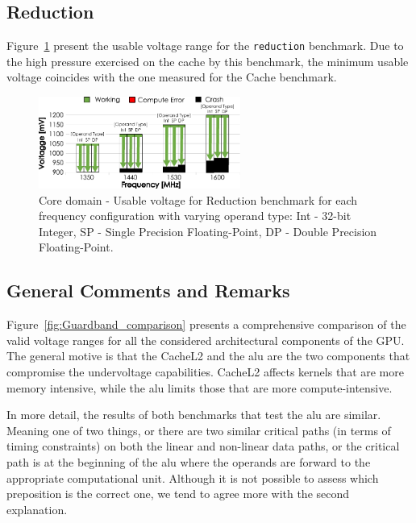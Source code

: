 \subsection{Reduction}

Figure~\ref{fig:Reduction_guardband} present the usable voltage range for the \texttt{reduction} benchmark. Due to the high pressure exercised on the cache by this benchmark, the minimum usable voltage coincides with the one measured for the Cache benchmark.

\begin{figure}[htb]
  \centering
  \includegraphics[width=0.59\textwidth]{Figures/GPU_characterization/Reduction_guardband.pdf}
  \caption{Core domain - Usable voltage for Reduction benchmark for each frequency configuration with varying operand type: Int - 32-bit Integer, SP - Single Precision Floating-Point, DP - Double Precision Floating-Point.}
  \label{fig:Reduction_guardband}
\end{figure}


\subsection{General Comments and Remarks}


Figure~\ref{fig:Guardband_comparison} presents a comprehensive comparison of the valid voltage ranges for all the considered architectural components of the GPU. The general motive is that the CacheL2 and the \acrshort{alu} are the two components that compromise the undervoltage capabilities. CacheL2 affects kernels that are more memory intensive, while the \acrshort{alu} limits those that are more compute-intensive. 

In more detail, the results of both benchmarks that test the \acrshort{alu} are similar. Meaning one of two things, or there are two similar critical paths (in terms of timing constraints) on both the linear and non-linear data paths, or the critical path is at the beginning of the  \acrshort{alu} where the operands are forward to the appropriate computational unit. Although it is not possible to assess which preposition is the correct one, we tend to agree more with the second explanation.


